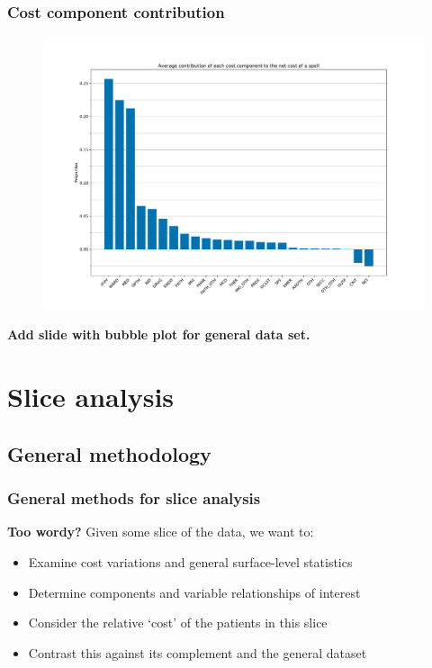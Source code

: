 \documentclass{beamer}
\begin{document}
\begin{frame}
    \frametitle{Cost component contribution}

    \begin{figure}
    \includegraphics[width=\linewidth]{./img/cost_contribution.pdf}
    \end{figure}
    \textbf{Add slide with bubble plot for general data set.}
\end{frame}


\section{Slice analysis}

\subsection{General methodology}

\begin{frame}
    \frametitle{General methods for slice analysis}
    \textbf{Too wordy?}
    Given some slice of the data, we want to:
    \begin{itemize}
        \item Examine cost variations and general surface-level statistics
        \item Determine components and variable relationships of interest
        \item Consider the relative `cost' of the patients in this slice
        \item Contrast this against its complement and the general dataset
    \end{itemize}
\end{frame}
\end{document}
